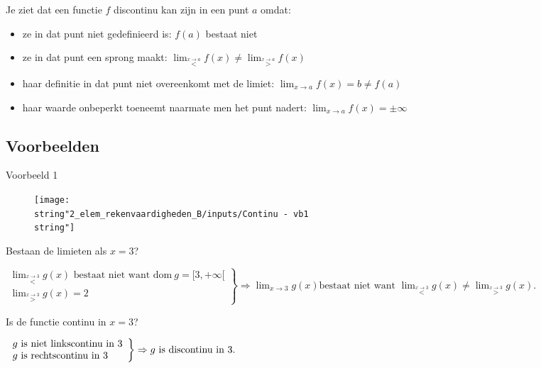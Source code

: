 \noindent Je ziet dat een functie $f$ discontinu kan zijn in een
punt $a$ omdat:
\begin{itemize}
\item ze in dat punt niet gedefinieerd is: $f(a)$ bestaat niet
\item ze in dat punt een sprong maakt: ${\displaystyle \lim_{\overset{x\rightarrow a}{<}}}f(x)$$\neq{\displaystyle \lim_{\overset{x\rightarrow a}{>}}}f(x)$
\item haar definitie in dat punt niet overeenkomt met de limiet: ${\displaystyle \lim_{x\to a}}f(x)$$=b\neq f(a)$ 
\item haar waarde onbeperkt toeneemt naarmate men het punt nadert: ${\displaystyle \lim_{x\to a}}f(x)$$=\pm\infty$ 
\end{itemize}

\subsection{Voorbeelden}

\noindent Voorbeeld 1

\begin{figure}[h]
	\centering
	\texttt{[image: \\string"2\_elem\_rekenvaardigheden\_B/inputs/Continu - vb1\\string"]}
\end{figure}

Bestaan de limieten als $x=3$?

\begin{math}
\left. \begin{array}{l}
{\displaystyle\lim_{\overset{x\rightarrow3}{<}}}g(x) \text{ bestaat niet want dom} \ g=[3,+\infty[\\
{\displaystyle \lim_{\overset{x\rightarrow3}{>}}}g(x)=2
\end{array}
\right\}
\Rightarrow{\displaystyle \lim_{x\to3}}g(x) \text{bestaat niet want } {\displaystyle\lim_{\overset{x\rightarrow3}{<}}}g(x) \neq {\displaystyle\lim_{\overset{x\rightarrow3}{>}}}g(x).
\end{math}

Is de functie continu in $x=3$?

\begin{math}
\centering
\left. \begin{array}{l}
g \text{ is niet linkscontinu in }3\\
g \text{ is rechtscontinu in }3
\end{array}
\right\}
\Rightarrow g \text{ is discontinu in }3.
\end{math}

